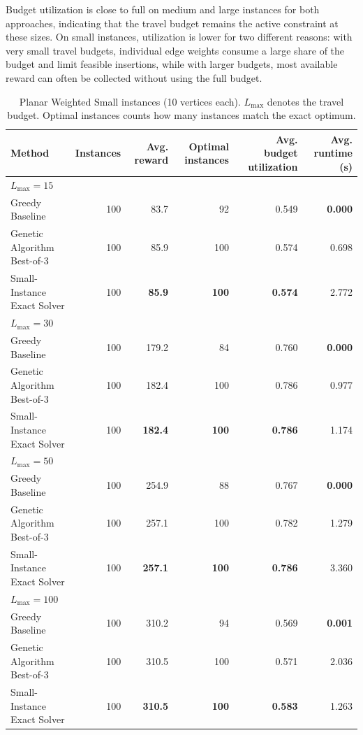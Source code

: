 \documentclass[report,english,cleveref,autoref,a4paper]{lipics-v2021}
\begin{document}
Budget utilization is close to full on medium and large instances for both
approaches, indicating that the travel budget remains the active constraint at
these sizes. On small instances, utilization is lower for two different reasons:
with very small travel budgets, individual edge weights consume a large share of
the budget and limit feasible insertions, while with larger budgets, most
available reward can often be collected without using the full budget.

\begin{table}[ht]
\centering
\caption{Planar Weighted Small instances (10 vertices each). $L_{\max}$ denotes the travel budget. Optimal instances counts how many instances match the exact optimum.}
\scriptsize
\setlength{\tabcolsep}{3pt}
\begin{tabular}{|l|r|r|r|r|r|}
\hline
Method & Instances & Avg. reward & Optimal instances & Avg. budget utilization & Avg. runtime (s) \\
\hline
\multicolumn{6}{|l|}{$L_{\max}=15$} \\
\hline
Greedy Baseline & 100 & 83.7 & 92 & 0.549 & \textbf{0.000} \\
\hline
Genetic Algorithm Best-of-3 & 100 & 85.9 & 100 & 0.574 & 0.698 \\
\hline
Small-Instance Exact Solver & 100 & \textbf{85.9} & \textbf{100} & \textbf{0.574} & 2.772 \\
\hline
\multicolumn{6}{|l|}{$L_{\max}=30$} \\
\hline
Greedy Baseline & 100 & 179.2 & 84 & 0.760 & \textbf{0.000} \\
\hline
Genetic Algorithm Best-of-3 & 100 & 182.4 & 100 & 0.786 & 0.977 \\
\hline
Small-Instance Exact Solver & 100 & \textbf{182.4} & \textbf{100} & \textbf{0.786} & 1.174 \\
\hline
\multicolumn{6}{|l|}{$L_{\max}=50$} \\
\hline
Greedy Baseline & 100 & 254.9 & 88 & 0.767 & \textbf{0.000} \\
\hline
Genetic Algorithm Best-of-3 & 100 & 257.1 & 100 & 0.782 & 1.279 \\
\hline
Small-Instance Exact Solver & 100 & \textbf{257.1} & \textbf{100} & \textbf{0.786} & 3.360 \\
\hline
\multicolumn{6}{|l|}{$L_{\max}=100$} \\
\hline
Greedy Baseline & 100 & 310.2 & 94 & 0.569 & \textbf{0.001} \\
\hline
Genetic Algorithm Best-of-3 & 100 & 310.5 & 100 & 0.571 & 2.036 \\
\hline
Small-Instance Exact Solver & 100 & \textbf{310.5} & \textbf{100} & \textbf{0.583} & 1.263 \\
\hline
\end{tabular}
\label{tab:planar-weighted-small-ttsp-results}
\end{table}
\end{document}
